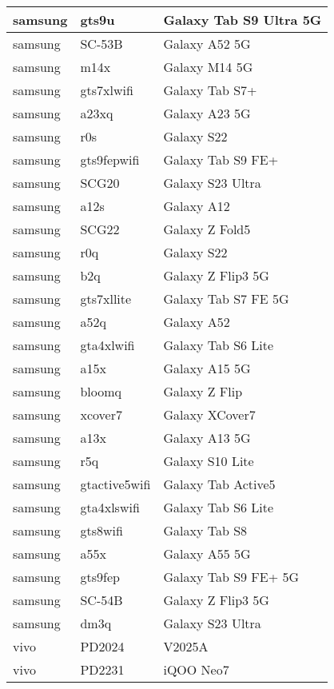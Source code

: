 \begin{tabularx}{\linewidth}{|l|X|X|}
        samsung & gts9u & Galaxy Tab S9 Ultra 5G \\ \hline
        samsung & SC-53B & Galaxy A52 5G \\ \hline
        samsung & m14x & Galaxy M14 5G \\ \hline
        samsung & gts7xlwifi & Galaxy Tab S7+ \\ \hline
        samsung & a23xq & Galaxy A23 5G \\ \hline
        samsung & r0s & Galaxy S22 \\ \hline
        samsung & gts9fepwifi & Galaxy Tab S9 FE+ \\ \hline
        samsung & SCG20 & Galaxy S23 Ultra \\ \hline
        samsung & a12s & Galaxy A12 \\ \hline
        samsung & SCG22 & Galaxy Z Fold5 \\ \hline
        samsung & r0q & Galaxy S22 \\ \hline
        samsung & b2q & Galaxy Z Flip3 5G \\ \hline
        samsung & gts7xllite & Galaxy Tab S7 FE 5G \\ \hline
        samsung & a52q & Galaxy A52 \\ \hline
        samsung & gta4xlwifi & Galaxy Tab S6 Lite \\ \hline
        samsung & a15x & Galaxy A15 5G \\ \hline
        samsung & bloomq & Galaxy Z Flip \\ \hline
        samsung & xcover7 & Galaxy XCover7 \\ \hline
        samsung & a13x & Galaxy A13 5G \\ \hline
        samsung & r5q & Galaxy S10 Lite \\ \hline
        samsung & gtactive5wifi & Galaxy Tab Active5 \\ \hline
        samsung & gta4xlswifi & Galaxy Tab S6 Lite \\ \hline
        samsung & gts8wifi & Galaxy Tab S8 \\ \hline
        samsung & a55x & Galaxy A55 5G \\ \hline
        samsung & gts9fep & Galaxy Tab S9 FE+ 5G \\ \hline
        samsung & SC-54B & Galaxy Z Flip3 5G \\ \hline
        samsung & dm3q & Galaxy S23 Ultra \\ \hline
        vivo & PD2024 & V2025A \\ \hline
        vivo & PD2231 & iQOO Neo7 \\ \hline

\end{tabularx}
